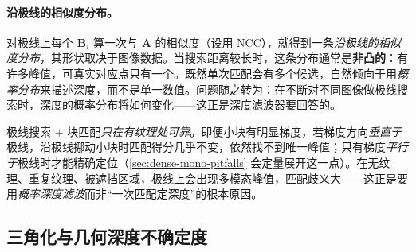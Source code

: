 \paragraph{沿极线的相似度分布。}
对极线上每个 $\mathbf{B}_i$ 算一次与 $\mathbf{A}$ 的相似度（设用 NCC），就得到一条\emph{沿极线的相似度分布}，其形状取决于图像数据。当搜索距离较长时，这条分布通常是\textbf{非凸的}：有许多峰值，可真实对应点只有一个。既然单次匹配会有多个候选，自然倾向于用\emph{概率分布}来描述深度，而不是单一数值。问题随之转为：在不断对不同图像做极线搜索时，深度的概率分布将如何变化——这正是深度滤波器要回答的。

\begin{pitfall}
极线搜索 $+$ 块匹配\emph{只在有纹理处可靠}。即便小块有明显梯度，若梯度方向\emph{垂直于}极线，沿极线挪动小块时匹配得分几乎不变，依然找不到唯一峰值；只有梯度\emph{平行于}极线时才能精确定位（\cref{sec:dense-mono-pitfalls} 会定量展开这一点）。在无纹理、重复纹理、被遮挡区域，极线上会出现多模态峰值，匹配歧义大——这正是要用\emph{概率深度滤波}而非“一次匹配定深度”的根本原因。
\end{pitfall}

\subsection{三角化与几何深度不确定度}
\label{sec:dense-triangulate-uncertainty}

